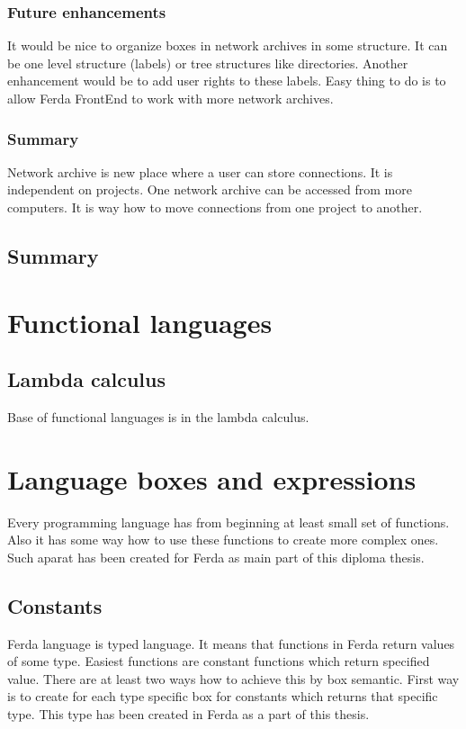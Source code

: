 \documentclass[a4paper,12pt]{book}
\begin{document}
\subsubsection{Future enhancements}
It would be nice to organize boxes in network archives in some structure. It can be one level structure (labels) or tree structures like directories. Another enhancement would be to add user rights to these labels. Easy thing to do is to allow Ferda FrontEnd to work with more network archives.

\subsubsection{Summary}
Network archive is new place where a user can store connections. It is independent on projects. One network archive can be accessed from more computers. It is way how to move connections from one project to another.

\subsection{Summary}

\section{Functional languages}

\subsection{Lambda calculus}
Base of functional languages is in the lambda calculus. 


\section{Language boxes and expressions}
Every programming language has from beginning at least small set of functions. Also it has some way how to use these functions to create more complex ones. Such aparat has been created for Ferda as main part of this diploma thesis.

\subsection{Constants}
Ferda language is typed language. It means that functions in Ferda return values of some type. Easiest functions are constant functions which return specified value. There are at least two ways how to achieve this by box semantic. First way is to create for each type specific box for constants which returns that specific type. This type has been created in Ferda as a part of this thesis.
\end{document}
